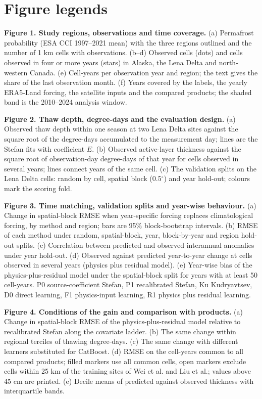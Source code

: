 \section*{Figure legends}

\textbf{Figure 1. Study regions, observations and time coverage.} (a) Permafrost probability (ESA CCI 1997--2021 mean) with the three regions outlined and the number of 1 km cells with observations. (b--d) Observed cells (dots) and cells observed in four or more years (stars) in Alaska, the Lena Delta and north-western Canada. (e) Cell-years per observation year and region; the text gives the share of the last observation month. (f) Years covered by the labels, the yearly ERA5-Land forcing, the satellite inputs and the compared products; the shaded band is the 2010--2024 analysis window.

\textbf{Figure 2. Thaw depth, degree-days and the evaluation design.} (a) Observed thaw depth within one season at two Lena Delta sites against the square root of the degree-days accumulated to the measurement day; lines are the Stefan fits with coefficient $E$. (b) Observed active-layer thickness against the square root of observation-day degree-days of that year for cells observed in several years; lines connect years of the same cell. (c) The validation splits on the Lena Delta cells: random by cell, spatial block (0.5$^\circ$) and year hold-out; colours mark the scoring fold.

\textbf{Figure 3. Time matching, validation splits and year-wise behaviour.} (a) Change in spatial-block RMSE when year-specific forcing replaces climatological forcing, by method and region; bars are 95\% block-bootstrap intervals. (b) RMSE of each method under random, spatial-block, year, block-by-year and region hold-out splits. (c) Correlation between predicted and observed interannual anomalies under year hold-out. (d) Observed against predicted year-to-year change at cells observed in several years (physics plus residual model). (e) Year-wise bias of the physics-plus-residual model under the spatial-block split for years with at least 50 cell-years. P0 source-coefficient Stefan, P1 recalibrated Stefan, Ku Kudryavtsev, D0 direct learning, F1 physics-input learning, R1 physics plus residual learning.

\textbf{Figure 4. Conditions of the gain and comparison with products.} (a) Change in spatial-block RMSE of the physics-plus-residual model relative to recalibrated Stefan along the covariate ladder. (b) The same change within regional terciles of thawing degree-days. (c) The same change with different learners substituted for CatBoost. (d) RMSE on the cell-years common to all compared products; filled markers use all common cells, open markers exclude cells within 25 km of the training sites of Wei et al. and Liu et al.; values above 45 cm are printed. (e) Decile means of predicted against observed thickness with interquartile bands.

